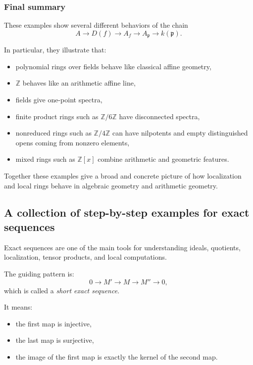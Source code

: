 \documentclass[12pt,a4paper]{article}
\theoremstyle{notespace}
\newcommand{\mf}{\mathfrak}
\theoremstyle{definition}
\begin{document}
\subsubsection{Final summary}

These examples show several different behaviors of the chain
\[
A \longrightarrow D(f) \longrightarrow A_f \longrightarrow A_{\mf p} \longrightarrow k(\mf p).
\]

In particular, they illustrate that:

\begin{itemize}
	\item polynomial rings over fields behave like classical affine geometry,
	\item \(\mathbb Z\) behaves like an arithmetic affine line,
	\item fields give one-point spectra,
	\item finite product rings such as \(\mathbb Z/6\mathbb Z\) have disconnected spectra,
	\item nonreduced rings such as \(\mathbb Z/4\mathbb Z\) can have nilpotents and empty distinguished opens coming from nonzero elements,
	\item mixed rings such as \(\mathbb Z[x]\) combine arithmetic and geometric features.
\end{itemize}

Together these examples give a broad and concrete picture of how localization and local rings behave in algebraic geometry and arithmetic geometry.

\subsection{A collection of step-by-step examples for exact sequences}

Exact sequences are one of the main tools for understanding ideals, quotients, localization, tensor products, and local computations.

The guiding pattern is:
\[
0 \longrightarrow M' \longrightarrow M \longrightarrow M'' \longrightarrow 0,
\]
which is called a \emph{short exact sequence}.

It means:

\begin{itemize}
	\item the first map is injective,
	\item the last map is surjective,
	\item the image of the first map is exactly the kernel of the second map.
\end{itemize}
\end{document}
